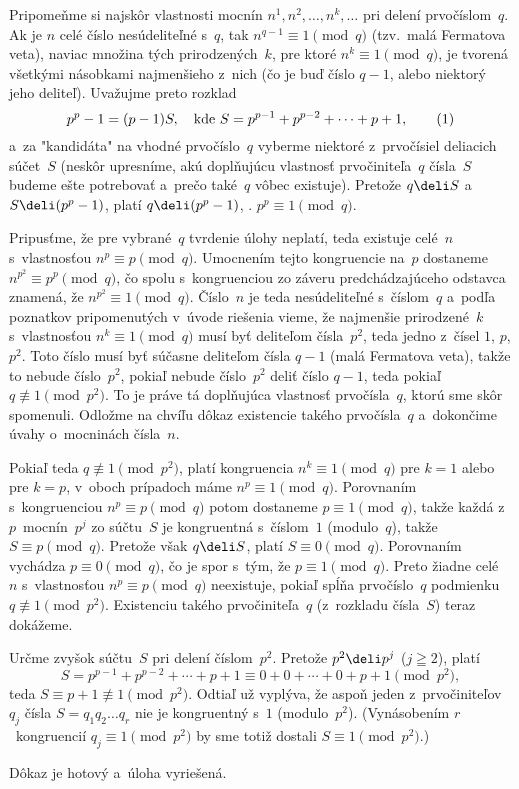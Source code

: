 {%
Pripomeňme si najskôr vlastnosti mocnín $n^1,n^2,\dots,n^k,\dots$
pri delení prvočíslom~$q$. Ak je $n$ celé číslo nesúdeliteľné s~$q$,
tak $n^{q-1}\equiv1\pmod q$ (tzv.~malá Fermatova veta),
naviac množina tých prirodzených~$k$, pre ktoré $n^{k}\equiv1\pmod
q$, je tvorená všetkými násobkami najmenšieho z~nich (čo je buď
číslo $q-1$, alebo niektorý jeho deliteľ).
Uvažujme preto rozklad
$$
p^p-1=(p-1)S,\quad\text{kde }S=p^{p-1}+p^{p-2}+\cdots+p+1,   \tag1
$$
a~za "kandidáta" na vhodné prvočíslo~$q$ vyberme niektoré
z~prvočísiel deliacich súčet~$S$
(neskôr upresníme, akú doplňujúcu vlastnosť
prvočiniteľa~$q$ čísla~$S$ budeme ešte potrebovať a~prečo
také~$q$ vôbec existuje). Pretože $q\deli S$ a~$S\deli(p^p-1)$,
platí $q\deli(p^p-1)$, \tj. $p^p\equiv1\pmod q$.

Pripusťme, že pre vybrané~$q$ tvrdenie úlohy neplatí, teda
existuje celé~$n$ s~vlastnosťou $n^p\equiv p\pmod q$. Umocnením
tejto kongruencie na~$p$ dostaneme $n^{p^2}\equiv p^p\pmod q$,
čo spolu s~kongruenciou zo záveru predchádzajúceho odstavca znamená, že
$n^{p^2}\equiv1\pmod q$. Číslo~$n$ je teda nesúdeliteľné
s~číslom~$q$ a~podľa poznatkov pripomenutých v~úvode riešenia vieme,
že najmenšie prirodzené~$k$ s~vlastnosťou $n^k\equiv1\pmod q$ musí
byť deliteľom čísla~$p^2$, teda jedno z~čísel $1$, $p$, $p^2$. Toto
číslo musí byť súčasne deliteľom čísla $q-1$ (malá Fermatova
veta), takže to nebude číslo~$p^2$, pokiaľ nebude číslo~$p^2$ deliť
číslo $q-1$, teda pokiaľ $q\not\equiv1\pmod{p^2}$. To je práve tá
doplňujúca vlastnosť prvočísla~$q$, ktorú sme skôr
spomenuli. Odložme na chvíľu dôkaz existencie takého prvočísla~$q$
a~dokončime úvahy o~mocninách čísla~$n$.

Pokiaľ teda $q\not\equiv1\pmod{p^2}$, platí kongruencia
$n^k\equiv1\pmod q$ pre $k=1$ alebo pre $k=p$, v~oboch prípadoch
máme $n^p\equiv1\pmod q$. Porovnaním s~kongruenciou $n^p\equiv
p\pmod q$ potom dostaneme $p\equiv1\pmod q$, takže každá z~$p$~mocnín~$p^j$
zo súčtu~$S$ je kongruentná s~číslom~$1$ (modulo~$q$),
takže $S\equiv p\pmod q$. Pretože však $q\deli S$, platí
$S\equiv0\pmod q$. Porovnaním vychádza $p\equiv0\pmod q$, čo je
spor s~tým, že $p\equiv1\pmod q$. Preto žiadne celé~$n$
s~vlastnosťou $n^p\equiv p\pmod q$ neexistuje, pokiaľ spĺňa
prvočíslo~$q$ podmienku $q\not\equiv1\pmod{p^2}$. Existenciu
takého prvočiniteľa~$q$ (z~rozkladu čísla~$S$) teraz dokážeme.

Určme zvyšok súčtu~$S$ pri delení číslom~$p^2$. Pretože
$p^2\deli p^j$ ($j\geqq2$), platí
$$
S=p^{p-1}+p^{p-2}+\cdots+p+1\equiv0+0+\cdots+0+p+1\pmod {p^2},
$$
teda $S\equiv p+1\not\equiv1\pmod{p^2}$. Odtiaľ už vyplýva, že
aspoň jeden z~prvočiniteľov~$q_j$ čísla $S=q_1q_2\dots q_r$ nie je
kongruentný s~$1$ (modulo~$p^2$). (Vynásobením $r$~kongruencií
$q_j\equiv1\pmod{p^2}$ by sme totiž dostali
$S\equiv1\pmod{p^2}$.)

Dôkaz je hotový a~úloha vyriešená.}


